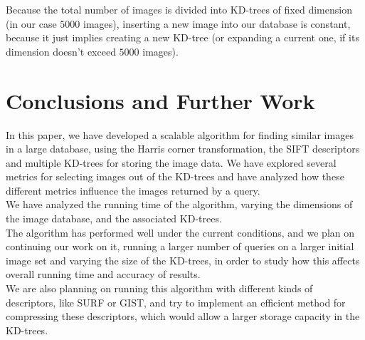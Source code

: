 \documentclass[conference]{IEEEtran}
\begin{document}
Because the total number of images is divided into KD-trees of fixed dimension (in our case $5000$ images), inserting a new image into our database is constant, because it just implies creating a new KD-tree (or expanding a current one, if its dimension doesn't exceed $5000$ images).

\section{Conclusions and Further Work}
In this paper, we have developed a scalable algorithm for finding similar images in a large database, using the Harris corner transformation, the SIFT descriptors and multiple KD-trees for storing the image data. We have explored several metrics for selecting images out of the KD-trees and have analyzed how these different metrics influence the images returned by a query.\\
We have analyzed the running time of the algorithm, varying the dimensions of the image database, and the associated KD-trees.\\
The algorithm has performed well under the current conditions, and we plan on continuing our work on it, running a larger number of queries on a larger initial image set and varying the size of the KD-trees, in order to study how this affects overall running time and accuracy of results.\\
We are also planning on running this algorithm with different kinds of descriptors, like SURF or GIST, and try to implement an efficient method for compressing these descriptors, which would allow a larger storage capacity in the KD-trees.




\end{document}
